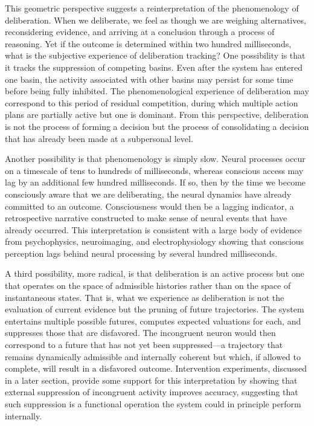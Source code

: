 \documentclass[11pt]{article}
\begin{document}
This geometric perspective suggests a reinterpretation of the phenomenology of deliberation. When we deliberate, we feel as though we are weighing alternatives, reconsidering evidence, and arriving at a conclusion through a process of reasoning. Yet if the outcome is determined within two hundred milliseconds, what is the subjective experience of deliberation tracking? One possibility is that it tracks the suppression of competing basins. Even after the system has entered one basin, the activity associated with other basins may persist for some time before being fully inhibited. The phenomenological experience of deliberation may correspond to this period of residual competition, during which multiple action plans are partially active but one is dominant. From this perspective, deliberation is not the process of forming a decision but the process of consolidating a decision that has already been made at a subpersonal level.

Another possibility is that phenomenology is simply slow. Neural processes occur on a timescale of tens to hundreds of milliseconds, whereas conscious access may lag by an additional few hundred milliseconds. If so, then by the time we become consciously aware that we are deliberating, the neural dynamics have already committed to an outcome. Consciousness would then be a lagging indicator, a retrospective narrative constructed to make sense of neural events that have already occurred. This interpretation is consistent with a large body of evidence from psychophysics, neuroimaging, and electrophysiology showing that conscious perception lags behind neural processing by several hundred milliseconds.

A third possibility, more radical, is that deliberation is an active process but one that operates on the space of admissible histories rather than on the space of instantaneous states. That is, what we experience as deliberation is not the evaluation of current evidence but the pruning of future trajectories. The system entertains multiple possible futures, computes expected valuations for each, and suppresses those that are disfavored. The incongruent neuron would then correspond to a future that has not yet been suppressed—a trajectory that remains dynamically admissible and internally coherent but which, if allowed to complete, will result in a disfavored outcome. Intervention experiments, discussed in a later section, provide some support for this interpretation by showing that external suppression of incongruent activity improves accuracy, suggesting that such suppression is a functional operation the system could in principle perform internally.
\end{document}
